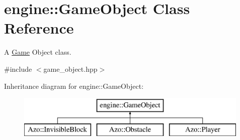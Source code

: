 \hypertarget{classengine_1_1_game_object}{}\section{engine\+:\+:Game\+Object Class Reference}
\label{classengine_1_1_game_object}


A \hyperlink{classengine_1_1_game}{Game} Object class.  




{\ttfamily \#include $<$game\+\_\+object.\+hpp$>$}

Inheritance diagram for engine\+:\+:Game\+Object\+:\begin{figure}[H]
\begin{center}
\leavevmode
\includegraphics[height=2.000000cm]{classengine_1_1_game_object}
\end{center}
\end{figure}
